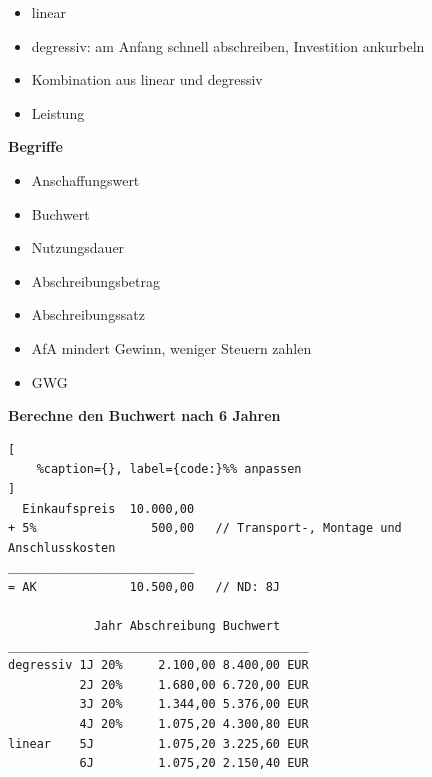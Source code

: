 \begin{itemize}
\item
  linear
\item
  degressiv: am Anfang schnell abschreiben, Investition ankurbeln
\item
  Kombination aus linear und degressiv
\item
  Leistung
\end{itemize}

\textbf{Begriffe}

\begin{itemize}
\item
  Anschaffungswert
\item
  Buchwert
\item
  Nutzungsdauer
\item
  Abschreibungsbetrag
\item
  Abschreibungssatz
\item
  AfA mindert Gewinn, weniger Steuern zahlen
\item
  GWG
\end{itemize}

\textbf{Berechne den Buchwert nach 6 Jahren}

\lstset{language=Python}%
\begin{lstlisting}[
	%caption={}, label={code:}%% anpassen
]
  Einkaufspreis  10.000,00
+ 5%                500,00   // Transport-, Montage und Anschlusskosten
__________________________
= AK             10.500,00   // ND: 8J

            Jahr Abschreibung Buchwert
__________________________________________           
degressiv 1J 20%     2.100,00 8.400,00 EUR
          2J 20%     1.680,00 6.720,00 EUR
          3J 20%     1.344,00 5.376,00 EUR      
          4J 20%     1.075,20 4.300,80 EUR
linear    5J         1.075,20 3.225,60 EUR
          6J         1.075,20 2.150,40 EUR
\end{lstlisting}
